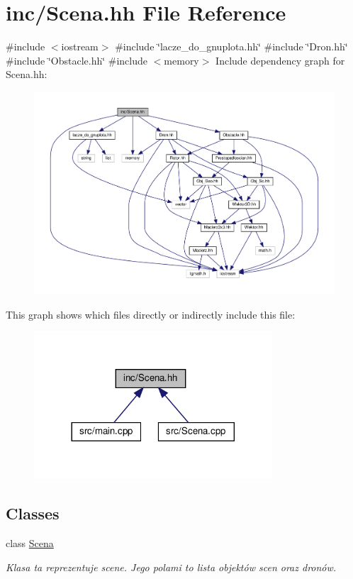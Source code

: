 \hypertarget{_scena_8hh}{}\section{inc/\+Scena.hh File Reference}
\label{_scena_8hh}
{\ttfamily \#include $<$iostream$>$}\newline
{\ttfamily \#include \char`\"{}lacze\+\_\+do\+\_\+gnuplota.\+hh\char`\"{}}\newline
{\ttfamily \#include \char`\"{}Dron.\+hh\char`\"{}}\newline
{\ttfamily \#include \char`\"{}Obstacle.\+hh\char`\"{}}\newline
{\ttfamily \#include $<$memory$>$}\newline
Include dependency graph for Scena.\+hh\+:
\nopagebreak
\begin{figure}[H]
\begin{center}
\leavevmode
\includegraphics[width=350pt]{_scena_8hh__incl}
\end{center}
\end{figure}
This graph shows which files directly or indirectly include this file\+:
\nopagebreak
\begin{figure}[H]
\begin{center}
\leavevmode
\includegraphics[width=252pt]{_scena_8hh__dep__incl}
\end{center}
\end{figure}
\subsection*{Classes}
\begin{DoxyCompactItemize}
\item 
class \hyperlink{class_scena}{Scena}
\begin{DoxyCompactList}\small\item\em Klasa ta reprezentuje scene. Jego polami to lista objektów scen oraz dronów. \end{DoxyCompactList}\end{DoxyCompactItemize}
